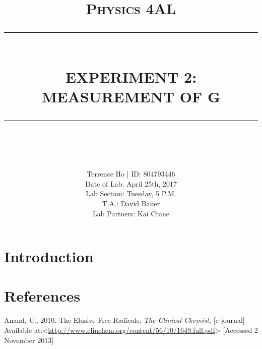 \documentclass[11pt]{report}
\newcommand{\HRule}[1]{\rule{\linewidth}{#1}}
\begin{document}
\title{ \normalsize \textsc{Physics 4AL}
        \\ [2.0cm]
        \HRule{0.5pt} \\
        \LARGE \textbf{\uppercase{Experiment 2: Measurement of g}}
        \HRule{2pt} \\ [0.5cm]
        \vspace*{2\baselineskip}}

\date{}

\author{
        Terrence Ho | ID: 804793446 \\ 
        Date of Lab: April 25th, 2017 \\
        Lab Section: Tuesday, 5 P.M.\\
        T.A.: David Bauer\\
        Lab Partners: Kai Crane}

\maketitle
\tableofcontents
\newpage

\sectionfont{\scshape}


\section*{Introduction}
\lipsum





\newpage
\section*{References}

Anand, U., 2010. The Elusive Free Radicals, \textit{The Clinical Chemist,} [e-journal] Available at:<\url{http://www.clinchem.org/content/56/10/1649.full.pdf}> [Accessed 2 November 2013]
\newline
\newline
\end{document}
